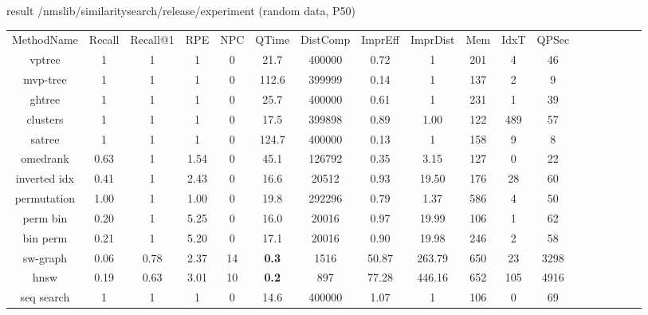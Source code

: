 \documentclass[xcolor=dvipsnames, aspectratio=1610]{beamer}
\newcommand{\alertA}[1]{\color{alertAcolor}#1\color{Black}}
\begin{document}
\begin{frame}[fragile]{result /nmslib/similarity\textunderscore search/release/experiment (random data, P50)} 
\linespread{1}\tiny{
\begin{minipage}{0.99\textwidth}  
{\fontsize{7}{2} \selectfont
\begin{tabular}{cccccccccccccccccc}
MethodName   & Recall & Recall@1 & RPE         & NPC & QTime & DistComp & ImprEff & ImprDist & Mem & IdxT & QPSec \\
vptree       & 1      & 1        & 1           & 0   & 21.7  & 400000   & 0.72    & 1        & 201 & 4    &  46  \\
mvp-tree     & 1      & 1        & 1           & 0   & 112.6 & 399999   & 0.14    & 1        & 137 & 2    &  9  \\
ghtree       & 1      & 1        & 1           & 0   & 25.7  & 400000   & 0.61    & 1        & 231 & 1    &  39  \\
 clusters    & 1      & 1        & 1           & 0   & 17.5  & 399898   & 0.89    & 1.00     & 122 & 489  &  57  \\
satree       & 1      & 1        & 1           & 0   & 124.7 & 400000   & 0.13    & 1        & 158 & 9    &  8  \\
omedrank     & 0.63   & 1        & 1.54        & 0   & 45.1  & 126792   & 0.35    & 3.15     & 127 & 0    &  22  \\
inverted idx & 0.41   & 1        & 2.43        & 0   & 16.6  & 20512    & 0.93    & 19.50    & 176 & 28   &  60 \\
permutation  & 1.00   & 1        & 1.00        & 0   & 19.8  & 292296   & 0.79    & 1.37     & 586 & 4    &  50 \\
perm bin     & 0.20   & 1        & 5.25        & 0   & 16.0  & 20016    & 0.97    & 19.99    & 106 & 1    &  62  \\
bin perm     & 0.21   & 1        & 5.20        & 0   & 17.1  & 20016    & 0.90    & 19.98    & 246 & 2    &  58  \\
sw-graph     & 0.06   & 0.78     & 2.37        & 14  & \alertA{\bf{0.3}}   & 1516     & 50.87   & 263.79   & 650 & 23   &  3298 \\
hnsw         & 0.19   & 0.63     & 3.01        & 10  & \alertA{\bf{0.2}}   & 897      & 77.28   & 446.16   & 652 & 105  &  4916  \\
seq search   & 1      & 1        & 1           & 0   & 14.6  & 400000   & 1.07    & 1        & 106 & 0    &  69  \\
\end{tabular}
}
\end{minipage}}
\end{frame}
\end{document}
